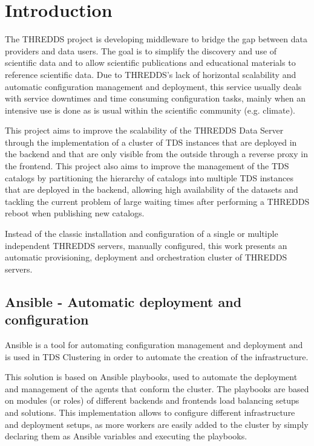 \documentclass[a4paper,12pt]{article}
\begin{document}


\section{Introduction}

The THREDDS project is developing middleware to bridge the gap between data providers and data users. The goal is to simplify the discovery and use of scientific data and to allow scientific publications and educational materials to reference scientific data. Due to THREDDS's lack of horizontal scalability and automatic configuration management and deployment, this service usually deals with service downtimes and time consuming configuration tasks, mainly when an intensive use is done as is usual within the scientific community (e.g. climate).

This project aims to improve the scalability of the THREDDS Data Server through the implementation of a cluster of TDS instances that are deployed in the backend and that are only visible from the outside through a reverse proxy in the frontend. This project also aims to improve the management of the TDS catalogs by partitioning the hierarchy of catalogs into multiple TDS instances that are deployed in the backend, allowing high availability of the datasets and tackling the current problem of large waiting times after performing a THREDDS reboot when publishing new catalogs.  

Instead of the classic installation and configuration of a single or multiple independent THREDDS servers, manually configured, this work presents an automatic provisioning, deployment and orchestration cluster of THREDDS servers.

\subsection{Ansible - Automatic deployment and configuration}

Ansible is a tool for automating configuration management and deployment and is used in TDS Clustering in order to automate the creation of the infrastructure.

This solution is based on Ansible playbooks, used to automate the deployment and management of the agents that conform the cluster. The playbooks are based on modules (or roles) of different backends and frontends load balancing setups and solutions. This implementation allows to configure different infrastructure and deployment setups, as more workers are easily added to the cluster by simply declaring them as Ansible variables and executing the playbooks.
\end{document}
